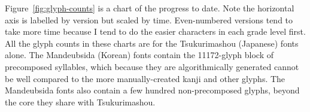 \documentclass[14pt]{extarticle}
\begin{document}
Figure~\ref{fig:glyph-counts} is a chart of the progress to date.  Note the
horizontal axis is labelled by version but scaled by time.  Even-numbered
versions tend to take more time because I tend to do the easier characters
in each grade level first.  All the glyph counts in these charts are for the
Tsukurimashou (Japanese) fonts alone.  The Mandeubsida (Korean) fonts contain
the 11172-glyph block of precomposed syllables, which because they are
algorithmically generated cannot be well compared to the more
manually-created kanji and other glyphs.  The Mandeubsida fonts also contain a
few hundred non-precomposed glyphs, beyond the core they share with
Tsukurimashou.


\end{document}
